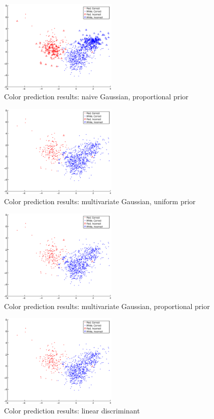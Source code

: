 \documentclass[twoside]{article}
\begin{document}
\begin{multicols}{2}
\begin{figure}[H]
\centering
\includegraphics[width=0.5\textwidth]{colorpca/naive_prior}
\caption{Color prediction results: naive Gaussian, proportional prior}
\end{figure}

\begin{figure}[H]
\centering
\includegraphics[width=0.5\textwidth]{colorpca/gauss_noprior}
\caption{Color prediction results: multivariate Gaussian, uniform prior}
\end{figure}

\begin{figure}[H]
\centering
\includegraphics[width=0.5\textwidth]{colorpca/gauss_prior}
\caption{Color prediction results: multivariate Gaussian, proportional prior}
\end{figure}

\begin{figure}[H]
\centering
\includegraphics[width=0.5\textwidth]{colorpca/linear_discr}
\caption{Color prediction results: linear discriminant}
\end{figure}


\end{multicols}
\end{document}

